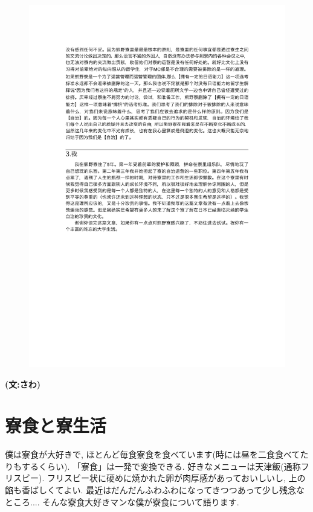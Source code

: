 \documentclass[10pt,b5jsbook,dvips,dvipdfmx,openany]{jsbook}
\theoremstyle{definition}
\begin{document}
\newpage
\begin{figure}[h]
		\begin{center}
 	 	\includegraphics[scale=0.90]{voice_2.pdf}
  \end{center}
		\end{figure}

    {\bf (文:さわ)}

	\section{寮食と寮生活}

	僕は寮食が大好きで, ほとんど毎食寮食を食べています(時には昼を二食食べてたりもするくらい). 「寮食」は一発で変換できる. 好きなメニューは天津飯(通称フリスビー). フリスビー状に硬めに焼かれた卵が肉厚感があっておいしいし, 上の餡も香ばしくてよい. 最近はだんだんふわふわになってきつつあって少し残念なところ.... そんな寮食大好きマンな僕が寮食について語ります.
\end{document}
